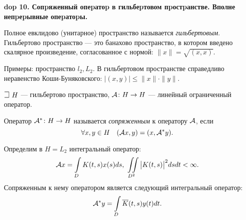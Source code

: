 \setcounter{section}{4}
\setcounter{subsection}{10}
\setcounter{equation}{0}
\textbf{\LARGE dop 10. Сопpяженный опеpатоp в гильбеpтовом пpостpанстве. Вполне непpеpывные опеpатоpы.}

\begin{definition}
Полное евклидово (унитарное) пространство называется \emph{гильбертовым}. Гильбертово пространство --- это банахово пространство, в котором введено скалярное произведение, согласованное с нормой: $\|x\| = \sqrt{(x, x)}$.
\end{definition}

\begin{Commentwhite}
Примеры: пространство $l_2, L_2$. В гильбертовом пространстве справедливо неравенство Коши-Буняковского: $|(x, y)|\le\|x\|\cdot\|y\|$.
\end{Commentwhite}

\begin{Commentwhite}
$\mathLet~H$ --- гильбертово пространство, ${\mathcal{A}}\colon H\to H$ --- линейный ограниченный оператор.
\end{Commentwhite}

\begin{definition}
Оператор ${\mathcal{A}}^*\colon H\to H$ называется \emph{сопряженным} к оператору ${\mathcal{A}}$, если
$$\forall x,y\in H \quad ({\mathcal{A}} x, y) = (x,{\mathcal{A}}^* y).$$
\end{definition}

\begin{example}
Определим в $H=L_2$ интегральный оператор:
$${\mathcal{A}} x = \int\limits_D K(t, s) x(s) ds,~\iint\limits_{D^2}\big|K(t, s)\big|^2 ds dt < \infty.$$
Сопряженным к нему оператором является следующий интегральный оператор:
$${\mathcal{A}}^* y = \int\limits_D \overline{K}(t, s) y(t) dt.$$
\end{example}

